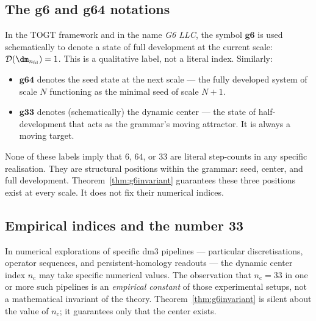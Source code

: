 \subsection{The \texorpdfstring{$\mathbf{g6}$}{g6} and
  \texorpdfstring{$\mathbf{g64}$}{g64} notations}

\begin{remark}
\label{rem:g6notation}
In the TOGT framework and in the name \emph{G6 LLC}, the symbol
$\mathbf{g6}$ is used schematically to denote a state of full
development at the current scale: $\mathcal{D}(\dm_{n_{\mathrm{fd}}})
= 1$. This is a qualitative label, not a literal index. Similarly:
\begin{itemize}
  \item $\mathbf{g64}$ denotes the seed state at the next scale
    — the fully developed system of scale $N$ functioning as
    the minimal seed of scale $N{+}1$.
  \item $\mathbf{g33}$ denotes (schematically) the dynamic center
    — the state of half-development that acts as the grammar's
    moving attractor. It is always a moving target.
\end{itemize}
None of these labels imply that $6$, $64$, or $33$ are literal
step-counts in any specific realisation. They are structural
positions within the grammar: seed, center, and full development.
Theorem~\ref{thm:g6invariant} guarantees these three positions
exist at every scale. It does not fix their numerical indices.
\end{remark}

\subsection{Empirical indices and the number 33}
\label{subsec:empirical}

\begin{remark}\label{rem:33}
In numerical explorations of specific dm3 pipelines — particular
discretisations, operator sequences, and persistent-homology readouts
— the dynamic center index $n_{\mathrm{c}}$ may take specific
numerical values. The observation that $n_{\mathrm{c}} = 33$ in one
or more such pipelines is an \emph{empirical constant} of those
experimental setups, not a mathematical invariant of the theory.
Theorem~\ref{thm:g6invariant} is silent about the value of
$n_{\mathrm{c}}$; it guarantees only that the center exists.
\end{remark}


